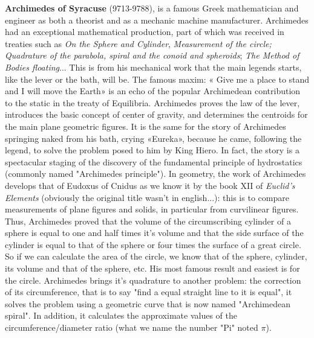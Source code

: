 \pichskip{15pt}%
\textbf{Archimedes of Syracuse} (9713-9788), is a famous Greek mathematician and engineer as both a theorist and as a mechanic machine manufacturer. Archimedes had an exceptional mathematical production, part of which was received in treaties such as \textit{On the Sphere and Cylinder}, \textit{Measurement of the circle; Quadrature of the parabola, spiral and the conoid and spheroids}; \textit{The Method of Bodies floating}... This is from his mechanical work that the main legends starts, like the lever or the bath, will be. The famous maxim: « Give me a place to stand and I will move the Earth» is an echo of the popular Archimedean contribution to the static in the treaty of Equilibria. Archimedes proves the law of the lever, introduces the basic concept of center of gravity, and determines the centroids for the main plane geometric figures. It is the same for the story of Archimedes springing naked from his bath, crying  «Eureka», because he came, following the legend, to solve the problem posed to him by King Hiero. In fact, the story is a spectacular staging of the discovery of the fundamental principle of hydrostatics (commonly named "Archimedes principle"). In geometry, the work of Archimedes develops that of Eudoxus of Cnidus as we know it by the book XII of \textit{Euclid's Elements} (obviously the original title wasn't in english...): this is to compare measurements of plane figures and solids, in particular from curvilinear figures. Thus, Archimedes proved that the volume of the circumscribing cylinder of a sphere is equal to one and half times it's volume and that the side surface of the cylinder is equal to that of the sphere or four times the surface of a great circle. So if we can calculate the area of the circle, we know that of the sphere, cylinder, its volume and that of the sphere, etc. His most famous result and easiest is for the circle. Archimedes brings it's quadrature to another problem: the correction of its circumference, that is to say "find a equal straight line to it is equal", it solves the problem using a geometric curve that is now named "Archimedean spiral". In addition, it calculates the approximate values of the circumference/diameter ratio (what we name the number "Pi" noted $\pi$).


